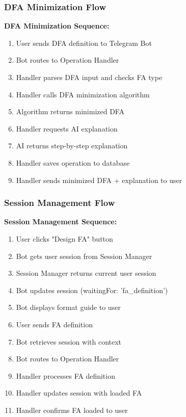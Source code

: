 \documentclass[12pt]{article}
\begin{document}
\subsubsection{DFA Minimization Flow}
\textbf{DFA Minimization Sequence:}
\begin{enumerate}
    \item User sends DFA definition to Telegram Bot
    \item Bot routes to Operation Handler
    \item Handler parses DFA input and checks FA type
    \item Handler calls DFA minimization algorithm
    \item Algorithm returns minimized DFA
    \item Handler requests AI explanation
    \item AI returns step-by-step explanation
    \item Handler saves operation to database
    \item Handler sends minimized DFA + explanation to user
\end{enumerate}

\subsubsection{Session Management Flow}
\textbf{Session Management Sequence:}
\begin{enumerate}
    \item User clicks "Design FA" button
    \item Bot gets user session from Session Manager
    \item Session Manager returns current user session
    \item Bot updates session (waitingFor: 'fa\_definition')
    \item Bot displays format guide to user
    \item User sends FA definition
    \item Bot retrieves session with context
    \item Bot routes to Operation Handler
    \item Handler processes FA definition
    \item Handler updates session with loaded FA
    \item Handler confirms FA loaded to user
\end{enumerate}
\end{document}
